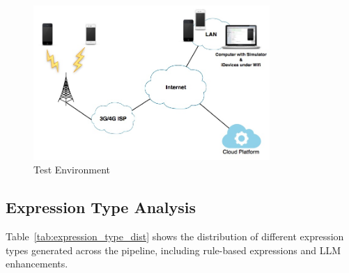 \begin{figure}[h]
\centering
\includegraphics[width=0.8\textwidth]{./Images/test_env}
\caption{Test Environment}
\label{fig:test_env}
\end{figure}

\subsection{Expression Type Analysis}

Table~\ref{tab:expression_type_dist} shows the distribution of different expression types generated across the pipeline, including rule-based expressions and LLM enhancements.

